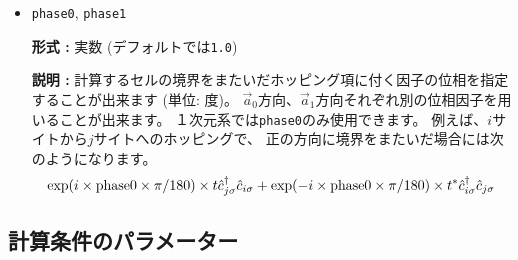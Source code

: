 \begin{itemize}
\item \verb|phase0|, \verb|phase1|

  {\bf 形式 :} 実数 (デフォルトでは\verb|1.0|)
  
  {\bf 説明 :} 計算するセルの境界をまたいだホッピング項に付く因子の位相を指定することが出来ます
  (単位: 度)。
  $\vec{a}_0$方向、$\vec{a}_1$方向それぞれ別の位相因子を用いることが出来ます。
  １次元系では\verb|phase0|のみ使用できます。
  例えば、$i$サイトから$j$サイトへのホッピングで、
  正の方向に境界をまたいだ場合には次のようになります。
  \begin{align}
    \exp(i \times {\rm phase0}\times\pi/180) \times t {\hat c}_{j \sigma}^\dagger {\hat c}_{i \sigma}
    + \exp(-i \times {\rm phase0}\times\pi/180) \times t^* {\hat c}_{i \sigma}^\dagger {\hat c}_{j \sigma}
  \end{align}

\end{itemize}

\subsection{計算条件のパラメーター}

